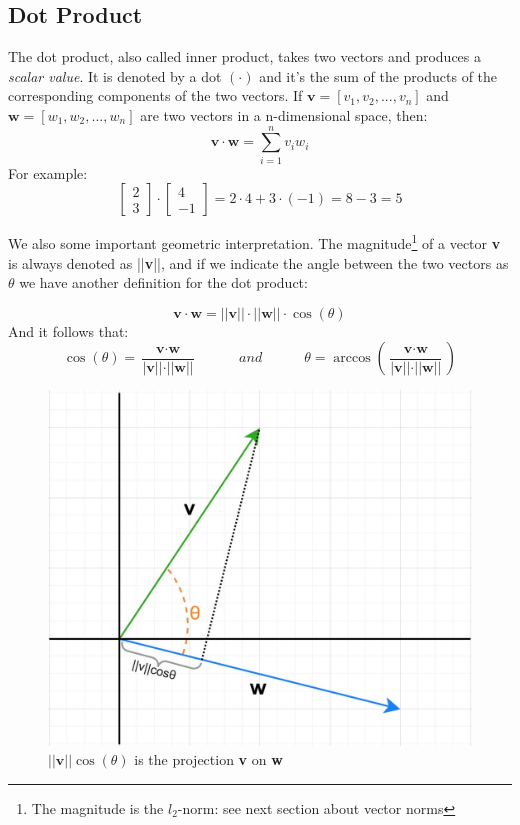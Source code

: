 \documentclass[
	11pt, %
	fleqn, %
	a4paper, %
]{LegrandOrangeBook}
\begin{document}
\subsection{Dot Product}
The dot product, also called inner product, takes two vectors and produces a \textit{scalar value}. It is denoted by a dot $(\cdot)$ and it's the sum
of the products of the corresponding components of the two vectors. If $ \textbf{v} = [v_{1}, v_{2}, ..., v_{n}] $ and $ \textbf{w} = [w_{1}, w_{2}, ..., w_{n}] $
are two vectors in a n-dimensional space, then:
$$
	\textbf{v} \cdot \textbf{w} = \sum_{i=1}^{n} v_i w_i
$$
For example:
$$
	\begin{bmatrix}
		2 \\ 3
	\end{bmatrix} \cdot
	\begin{bmatrix}
		4 \\ -1
	\end{bmatrix} = 2 \cdot 4 + 3 \cdot (-1) =  8 - 3 = 5
$$

We also some important geometric interpretation. The magnitude\footnote{The magnitude is the $l_2$-norm: see next section about vector norms} of a vector \textbf{v} is always denoted as ||\textbf{v}||, and if we indicate the angle between the two vectors as $\theta$ we have another definition for the dot product:

$$
	\textbf{v} \cdot \textbf{w} = ||\textbf{v}|| \cdot ||\textbf{w}|| \cdot \cos(\theta)
$$
And it follows that:
$$
	\cos(\theta) = \frac{\textbf{v} \cdot \textbf{w}}{|\textbf{v}|| \cdot ||\textbf{w}||} \quad\quad\quad and \quad\quad\quad \theta = \arccos(\frac{\textbf{v} \cdot \textbf{w}}{|\textbf{v}|| \cdot ||\textbf{w}||})
$$
\begin{figure}[h]
	\centering
	\includegraphics[scale = 0.6]{Images/dot_product.jpg}
	\caption{$||\textbf{v}||\cos(\theta)$ is the projection \textbf{v} on \textbf{w}}
\end{figure}
\end{document}
